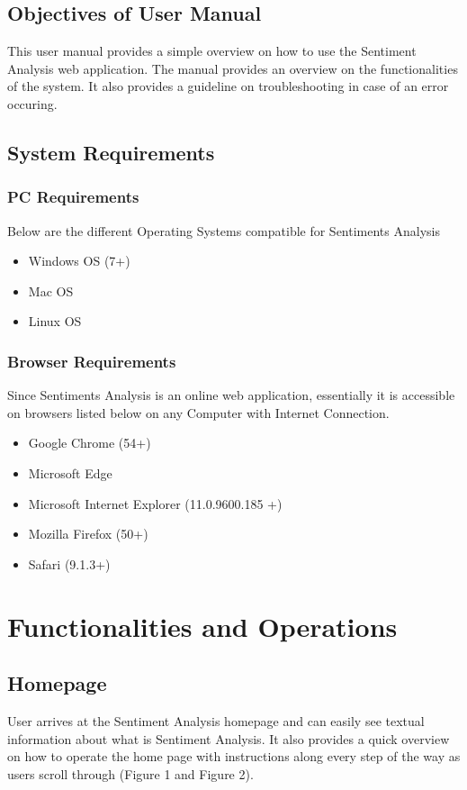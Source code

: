 \documentclass[12pt, titlepage]{article}
\begin{document}
\subsection{Objectives of User Manual}
This user manual provides a simple overview on how to use the Sentiment Analysis web application. The manual provides an overview on the functionalities of the system. It also provides a guideline on troubleshooting in case of an error occuring. 

\subsection{System Requirements}
\subsubsection{PC Requirements}
Below are the different Operating Systems compatible for Sentiments Analysis
\begin{itemize}
	\item Windows OS (7+)
	\item Mac OS
	\item Linux OS
\end{itemize}
\subsubsection{Browser Requirements}
Since Sentiments Analysis is an online web application, essentially it is accessible on browsers listed below on any Computer with Internet Connection.
\begin{itemize}
	\item Google Chrome (54+)
	\item Microsoft Edge
	\item Microsoft Internet Explorer (11.0.9600.185 +)
	\item Mozilla Firefox (50+)
	\item Safari (9.1.3+)
\end{itemize}

\section{Functionalities and Operations}
\subsection{Homepage}
User arrives at the Sentiment Analysis homepage and can easily see textual information about what is Sentiment Analysis. It also provides a quick overview on how to operate the home page with instructions along every step of the way as users scroll through (Figure 1 and Figure 2). 
\end{document}
